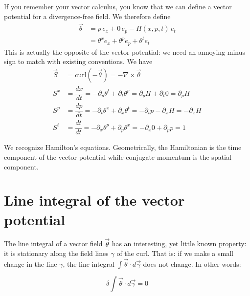 \documentclass[aps,pra,10pt,floatfix,nofootinbib]{revtex4-1}
\theoremstyle{definition}
\begin{document}
If you remember your vector calculus, you know that we can define a vector potential for a divergence-free field. We therefore define
\begin{equation}
\begin{aligned}
\vec{\theta} &= p \, e_x + 0 \, e_p - H(x,p,t) \, e_t \\ 
&= \theta^x e_x + \theta^p e_p + \theta^t e_t 
\end{aligned}
\label{flow}
\end{equation}
This is actually the opposite of the vector potential: we need an annoying minus sign to match with existing conventions. We have
\begin{equation}
\begin{aligned}
\vec{S} &= \mathrm{curl}(-\vec{\theta}) = - \nabla \times \vec{\theta} \\
S^x &= \dfrac{dx}{dt} = - \partial_p \theta^t + \partial_t \theta^p = \partial_p H + \partial_t 0 = \partial_p H \\
S^p &= \dfrac{dp}{dt} = - \partial_t \theta^x + \partial_x \theta^t = -\partial_t p - \partial_x H = - \partial_x H \\
S^t &= \dfrac{dt}{dt} = - \partial_x \theta^p + \partial_p \theta^x = - \partial_x 0 + \partial_p p = 1
\end{aligned}
\label{HamiltonEquations}
\end{equation}

We recognize Hamilton's equations. Geometrically, the Hamiltonian is the time component of the vector potential while conjugate momentum is the spatial component.

\section{Line integral of the vector potential}

The line integral of a vector field $\vec{\theta}$ has an interesting, yet little known property: it is stationary along the field lines $\gamma$ of the curl. That is: if we make a small change in the line $\gamma$, the line integral $\int \vec{\theta} \cdot d\vec{\gamma}$ does not change. In other words:

\begin{equation}
\delta \int \vec{\theta} \cdot d\vec{\gamma} = 0
\label{stationaryLineIntegral}
\end{equation}
\end{document}
